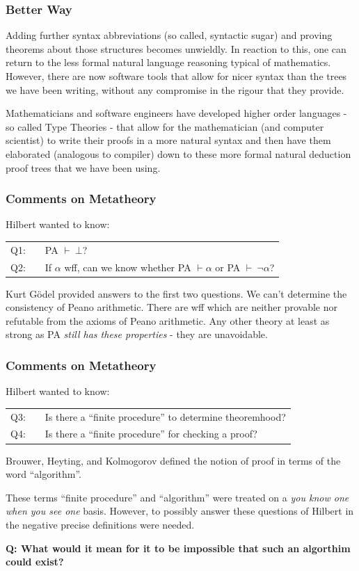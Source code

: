 \documentclass{beamer}
\theoremstyle{indentDefn} \newtheorem{defn}[]{Definition}
\begin{document}
\begin{frame}
	\frametitle{Better Way}

	Adding further syntax abbreviations (so called, syntactic sugar) and proving theorems about those structures becomes unwieldly. In reaction to this, one can return to the less formal natural language reasoning typical of mathematics. However, there are now software tools that allow for nicer syntax than the trees we have been writing, without any compromise in the rigour that they provide. 

	Mathematicians and software engineers have developed higher order languages - so called Type Theories - that allow for the mathematician (and computer scientist) to write their proofs in a more natural syntax and then have them elaborated (analogous to compiler) down to these more formal natural deduction proof trees that we have been using. 
	

\end{frame}

\begin{frame}
	\frametitle{Comments on Metatheory}

	Hilbert wanted to know: 

	\begin{tabular}{r c l}
		Q1: & & PA $\vdash \ \bot$? \\
		Q2: & & If $\alpha$ wff, can we know whether PA $\vdash \alpha$ or PA $\vdash \ \lnot \alpha$?
	\end{tabular}		

	Kurt G\"{o}del provided answers to the first two questions. We can't determine the consistency of Peano arithmetic. There are wff which are neither provable nor refutable from the axioms of Peano arithmetic. Any other theory at least as strong as PA \emph{still has these properties} - they are unavoidable.

\end{frame}

\begin{frame}
	\frametitle{Comments on Metatheory}
	Hilbert wanted to know:

	\begin{tabular}{r c l}
		Q3: & & Is there a ``finite procedure'' to determine theoremhood? \\
		Q4: & & Is there a ``finite procedure'' for checking a proof? 
	\end{tabular}

	Brouwer, Heyting, and Kolmogorov defined the notion of proof in terms of the word ``algorithm''.
	
	These terms ``finite procedure'' and ``algorithm'' were treated on a \emph{you know one when you see one} basis. However, to possibly answer these questions of Hilbert in the negative precise definitions were needed. 

	{\bf Q: What would it mean for it to be impossible that such an algorthim could exist?}
\end{frame}
\end{document}
